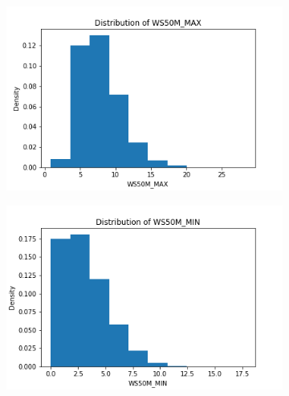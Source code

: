 \documentclass{article}
\begin{document}
\begin{itemize}
\begin{figure}[htbp]
\begin{subfigure}{0.3\textwidth}
            \end{subfigure}
            \begin{subfigure}{0.3\textwidth}
                \centering
                \includegraphics[width=\linewidth]{pic/hist/Distribution WS50M_MAX .png}
            \end{subfigure}
            \begin{subfigure}{0.3\textwidth}
                \centering
                \includegraphics[width=\linewidth]{pic/hist/Distribution WS50M_MIN .png}
            \end{subfigure}
            \begin{subfigure}{0.3\textwidth}
                \centering

\end{subfigure}
\end{figure}
\end{itemize}
\end{document}
